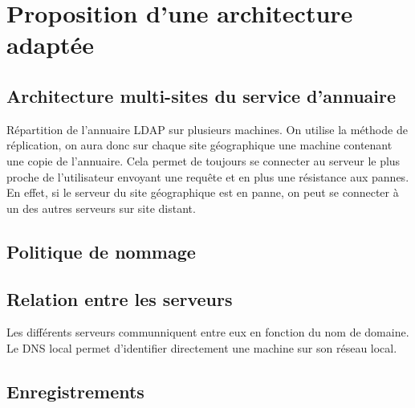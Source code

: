 \section{Proposition d'une architecture adaptée}

\subsection{Architecture multi-sites du service d'annuaire}

Répartition de l'annuaire LDAP sur plusieurs machines. On utilise la méthode de
réplication, on aura donc sur chaque site géographique une machine contenant 
une copie de l'annuaire. Cela permet de toujours se connecter au serveur le 
plus proche de l'utilisateur envoyant une requête et en plus une résistance 
aux pannes. En effet, si le serveur du site géographique est en panne, on peut
se connecter à un des autres serveurs sur site distant.

\subsection{Politique de nommage}



\subsection{Relation entre les serveurs}

Les différents serveurs communniquent entre eux en fonction du nom de domaine. 
Le DNS local permet d'identifier directement une machine sur son réseau local.


\subsection{Enregistrements}


